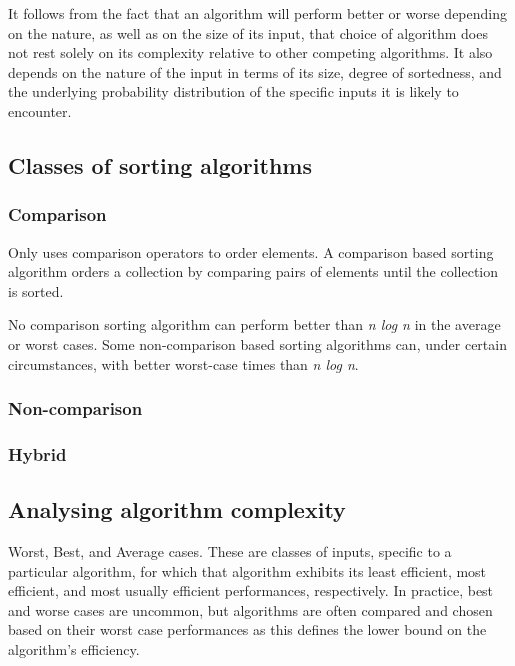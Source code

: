 \documentclass[12pt, a4paper]{article}
\begin{document}
It follows from the fact that an algorithm will perform better or worse depending on the nature, as well as on the size of its input, that choice of algorithm does not rest solely on its complexity relative to other competing algorithms. It also depends on the nature of the input in terms of its size, degree of sortedness, and the underlying probability distribution of the specific inputs it is likely to encounter.

\subsection{Classes of sorting algorithms}

\subsubsection{Comparison}

Only uses comparison operators to order elements. A comparison based sorting algorithm orders a collection by comparing pairs of elements until the collection is sorted.

No comparison sorting algorithm can perform better than \emph{n log n} in the average or worst cases. Some non-comparison based sorting algorithms can, under certain circumstances, with better worst-case times than \emph{n log n}.

\subsubsection{Non-comparison}


\subsubsection{Hybrid}



\subsection{Analysing algorithm complexity}

Worst, Best, and Average cases.
These are classes of inputs, specific to a particular algorithm, for which that algorithm exhibits its least efficient, most efficient, and most usually efficient performances, respectively. In practice, best and worse cases are uncommon, but algorithms are often compared and chosen based on their worst case performances as this defines the lower bound on the algorithm's efficiency.
\end{document}
